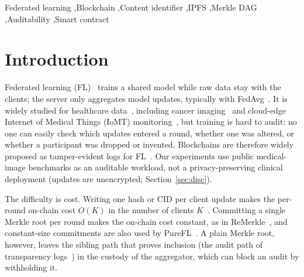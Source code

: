 \documentclass[final,3p,times,twocolumn]{elsarticle}
\begin{document}
\begin{frontmatter}
\begin{keyword}
Federated learning \sep Blockchain \sep Content identifier \sep IPFS \sep Merkle DAG \sep Auditability \sep Smart contract
\end{keyword}
\end{frontmatter}

\section{Introduction}\label{sec:intro}
Federated learning (FL)~\cite{kairouz} trains a shared model while raw data stay with the clients; the server only aggregates model updates, typically with FedAvg~\cite{mcmahan}. It is widely studied for healthcare data~\cite{prayitno2021}, including cancer imaging~\cite{pamungkas2026} and cloud-edge Internet of Medical Things (IoMT) monitoring~\cite{putra2024iomt}, but training is hard to audit: no one can easily check which updates entered a round, whether one was altered, or whether a participant was dropped or invented. Blockchains are therefore widely proposed as tamper-evident logs for FL~\cite{qammar,rizzini}. Our experiments use public medical-image benchmarks as an auditable workload, not a privacy-preserving clinical deployment (updates are unencrypted; Section~\ref{sec:disc}).

The difficulty is cost. Writing one hash or CID per client update makes the per-round on-chain cost $O(K)$ in the number of clients $K$~\cite{rauthan,khor}. Committing a single Merkle root per round makes the on-chain cost constant, as in ReMerkle~\cite{remerkle}, and constant-size commitments are also used by PureFL~\cite{purefl}. A plain Merkle root, however, leaves the sibling path that proves inclusion (the audit path of transparency logs~\cite{rfc6962}) in the custody of the aggregator, which can block an audit by withholding it.
\end{document}
